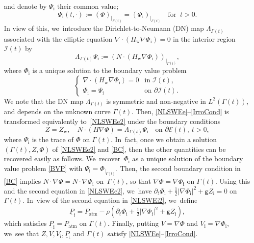 \documentclass[JEP,XML,SOM,Unicode,NoFloatCountersInSection,published]{cedram}
\newcommand{\gr}{{\mathtt g}}
\newcommand{\dt}{\partial_t}
\newcommand{\cI}{{\mathcal I}}
\newcommand{\cE}{{\mathcal E}}
\newcommand{\ul}[1]{\underline{#1}}
\newcommand{\itGamma}{\mathit{\Gamma}}
\theoremstyle{definition}
\begin{document}
and denote by $\Psi_\mathrm{i}$ their common value;
\begin{equation}\label{ContPhi}
\Psi_\mathrm{i}(t,\cdot):= (\Phi)_{\vert_{ \itGamma(t)}}=(\Phi_\mathrm{i})_{\vert_{ \itGamma(t)}} \quad\text{for } \ t>0.
\end{equation}
In view of this, we~introduce the Dirichlet-to-Neumann (DN) map $\Lambda_{\itGamma(t)}$ associated with the elliptic equation
$\nabla\cdot(H_\mathrm{w}\nabla\Phi_\mathrm{i})=0$ in the interior region $\cI(t)$ by
\begin{equation}\label{defDN}
\Lambda_{\itGamma(t)} \Psi_\mathrm{i}:= (N\cdot (H_\mathrm{w}\nabla\Phi_\mathrm{i}))_{\vert_{\itGamma(t)}},
\end{equation}
where $\Phi_\mathrm{i}$ is a unique solution to the boundary value problem
\begin{equation}\label{BVP}
\begin{cases}
\nabla\cdot(H_\mathrm{w}\nabla\Phi_\mathrm{i})=0 &\text{in } \cI(t), \\
\Phi_\mathrm{i}=\Psi_\mathrm{i} &\text{on } \partial\cI(t).
\end{cases}
\end{equation}
We note that the DN map $\Lambda_{\itGamma(t)}$ is symmetric and non-negative in $L^2(\itGamma(t))$, and depends on the unknown curve $\itGamma(t)$.
Then, \eqref{NLSWEe}--\eqref{IrroCond} is transformed equivalently to~\eqref{NLSWEe2} under the boundary conditions
\begin{equation}\label{BC}
Z=Z_\mathrm{w}, \quad N\cdot(H\nabla\Phi)=\Lambda_{\itGamma(t)}\Psi_\mathrm{i} \quad\text{on } \partial\cE(t), \ t>0,
\end{equation}
where $\Psi_\mathrm{i}$ is the trace of $\Phi$ on $\itGamma(t)$. In~fact, once we obtain a solution $(\itGamma(t),Z,\Phi)$ of \eqref{NLSWEe2} and \eqref{BC}, then the other quantities can be recovered easily as follows. We~recover~$\Phi_\mathrm{i}$ as a unique solution of the boundary value problem \eqref{BVP} with $\Psi_\mathrm{i}=\Phi_{\vert_{\itGamma(t)}}$.
Then, the second boundary condition in \eqref{BC} implies $N\cdot\nabla\Phi=N\cdot\nabla\Phi_\mathrm{i}$ on~$\itGamma(t)$,
so that $\nabla\Phi=\nabla\Phi_\mathrm{i}$ on $\itGamma(t)$.
Using this and the second equation in \eqref{NLSWEe2}, we~have $\dt\Phi_\mathrm{i} + \frac12|\nabla\Phi_\mathrm{i}|^2 + \gr Z_\mathrm{i} = 0$ on $\itGamma(t)$. In~view of the second equation in \eqref{NLSWEi2}, we~define
\begin{equation}\label{defPi}
\ul{P}_\mathrm{i}=P_\mathrm{atm}-\rho(\dt\Phi_\mathrm{i} + \tfrac12|\nabla\Phi_\mathrm{i}|^2 + \gr Z_\mathrm{i}),
\end{equation}
which satisfies $\ul{P}_\mathrm{i}=P_\mathrm{atm}$ on $\itGamma(t)$.
Finally, putting $V=\nabla\Phi$ and $V_\mathrm{i}=\nabla\Phi_\mathrm{i}$, we~see that $Z,V,V_\mathrm{i},\ul{P}_\mathrm{i}$ and $\itGamma(t)$ satisfy \eqref{NLSWEe}--\eqref{IrroCond}.
\end{document}
